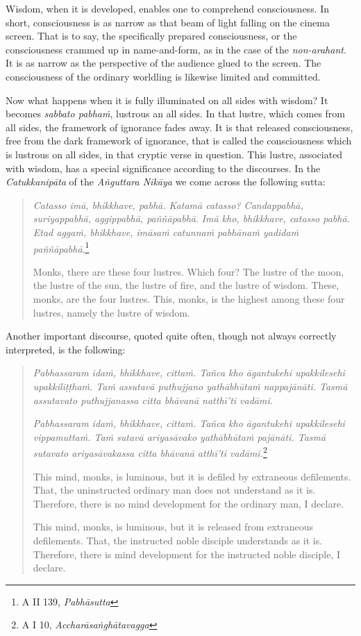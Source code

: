 Wisdom, when it is developed, enables one to comprehend consciousness. In short, consciousness is as narrow as that beam of light falling on the cinema screen. That is to say, the specifically prepared consciousness, or the consciousness crammed up in name-and-form, as in the case of the \emph{non-arahant}. It is as narrow as the perspective of the audience glued to the screen. The consciousness of the ordinary worldling is likewise limited and committed.

Now what happens when it is fully illuminated on all sides with wisdom? It becomes \emph{sabbato pabhaṁ}, lustrous an all sides. In that lustre, which comes from all sides, the framework of ignorance fades away. It is that released consciousness, free from the dark framework of ignorance, that is called the consciousness which is lustrous on all sides, in that cryptic verse in question. This lustre, associated with wisdom, has a special significance according to the discourses. In the \emph{Catukkanipāta} of the \emph{Aṅguttara Nikāya} we come across the following sutta:

\begin{quote}
\emph{Catasso imā, bhikkhave, pabhā. Katamā catasso? Candappabhā, suriyappabhā, aggippabhā, paññāpabhā}. \emph{Imā kho, bhikkhave, catasso pabhā. Etad aggaṁ, bhikkhave, imāsaṁ catunnaṁ pabhānaṁ yadidaṁ paññāpabhā}.\footnote{A II 139, \emph{Pabhāsutta}}

Monks, there are these four lustres. Which four? The lustre of the moon, the lustre of the sun, the lustre of fire, and the lustre of wisdom. These, monks, are the four lustres. This, monks, is the highest among these four lustres, namely the lustre of wisdom.
\end{quote}

Another important discourse, quoted quite often, though not always correctly interpreted, is the following:

\begin{quote}
\emph{Pabhassaram idaṁ, bhikkhave, cittaṁ. Tañca kho āgantukehi upakkilesehi upakkiliṭṭhaṁ. Taṁ assutavā puthujjano yathābhūtaṁ nappajānāti. Tasmā assutavato puthujjanassa citta bhāvanā natthī'ti vadāmi.}

\emph{Pabhassaram idaṁ, bhikkhave, cittaṁ. Tañca kho āgantukehi upakkilesehi vippamuttaṁ. Taṁ sutavā ariyasāvako yathābhūtaṁ pajānāti. Tasmā sutavato ariyasāvakassa citta bhāvanā atthī'ti vadāmi.}\footnote{A I 10, \emph{Accharāsaṅghātavagga}}

This mind, monks, is luminous, but it is defiled by extraneous defilements. That, the uninstructed ordinary man does not understand as it is. Therefore, there is no mind development for the ordinary man, I declare.

This mind, monks, is luminous, but it is released from extraneous defilements. That, the instructed noble disciple understands as it is. Therefore, there is mind development for the instructed noble disciple, I declare.
\end{quote}

